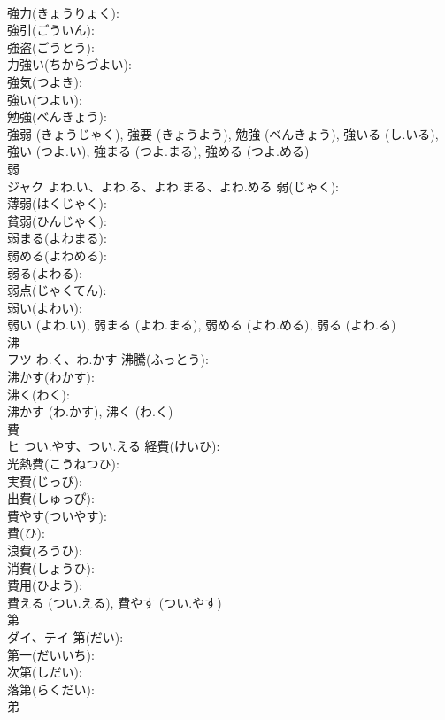 \documentclass[8pt]{extreport}
\begin{document}
\begin{CJK}{UTF8}{min}
\\	強力(きょうりょく): 
\\	強引(ごういん): 
\\	強盗(ごうとう): 
\\	力強い(ちからづよい): 
\\	強気(つよき): 
\\	強い(つよい): 
\\	勉強(べんきょう): 
\\	強弱 (きょうじゃく), 強要 (きょうよう), 勉強 (べんきょう), 強いる (し.いる), 強い (つよ.い), 強まる (つよ.まる), 強める (つよ.める)
\\	弱			
\\	ジャク	よわ.い、よわ.る、よわ.まる、よわ.める	弱(じゃく): 
\\	薄弱(はくじゃく): 
\\	貧弱(ひんじゃく): 
\\	弱まる(よわまる): 
\\	弱める(よわめる): 
\\	弱る(よわる): 
\\	弱点(じゃくてん): 
\\	弱い(よわい): 
\\	弱い (よわ.い), 弱まる (よわ.まる), 弱める (よわ.める), 弱る (よわ.る)
\\	沸			
\\	フツ	わ.く、わ.かす	沸騰(ふっとう): 
\\	沸かす(わかす): 
\\	沸く(わく): 
\\	沸かす (わ.かす), 沸く (わ.く)
\\	費			
\\	ヒ	つい.やす、つい.える	経費(けいひ): 
\\	光熱費(こうねつひ): 
\\	実費(じっぴ): 
\\	出費(しゅっぴ): 
\\	費やす(ついやす): 
\\	費(ひ): 
\\	浪費(ろうひ): 
\\	消費(しょうひ): 
\\	費用(ひよう): 
\\	費える (つい.える), 費やす (つい.やす)
\\	第			
\\	ダイ、テイ		第(だい): 
\\	第一(だいいち): 
\\	次第(しだい): 
\\	落第(らくだい): 
\\	弟			

\end{CJK}
\end{document}
